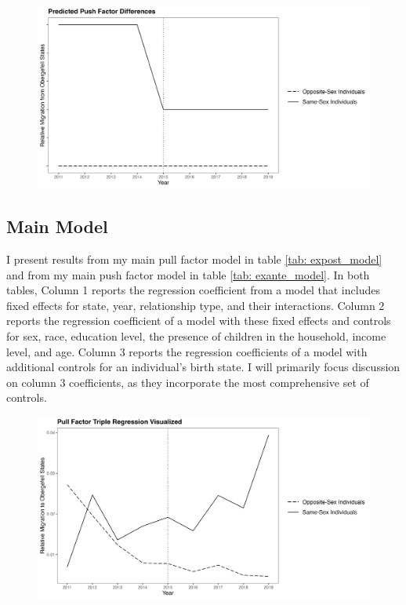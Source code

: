 \documentclass[12pt,letterpaper]{article}
\begin{document}
\begin{figure}[htbp]
    \centering
    \includegraphics[width=0.75\linewidth]{outputs/summary_stats/ex_ante_diffs.png}
    \caption{}
    \label{fig: ex_ante_diffs}
\end{figure}


\FloatBarrier
\subsection{Main Model} %
I present results from my main pull factor model in table \ref{tab: expost_model} and from my main push factor model in table \ref{tab: exante_model}. In both tables, Column 1 reports the regression coefficient from a model that includes fixed effects for state, year, relationship type, and their interactions. Column 2 reports the regression coefficient of a model with these fixed effects and controls for sex, race, education level, the presence of children in the household, income level, and age. Column 3 reports the regression coefficients of a model with additional controls for an individual’s birth state. I will primarily focus discussion on column 3 coefficients, as they incorporate the most comprehensive set of controls.

\begin{figure}[htbp]
    \centering
    \includegraphics[width=0.75\linewidth]{outputs/summary_stats/post_diffs.png}
    \caption{}
    \label{fig: post_diffs}
\end{figure}
\end{document}
